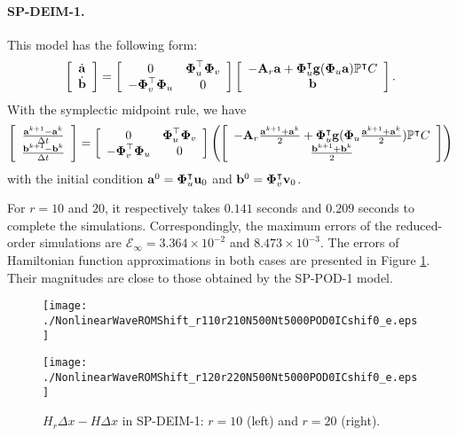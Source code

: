 \documentclass[11pt]{article}
\begin{document}
\paragraph{SP-DEIM-1.} This model has the following form: 
\begin{equation}
\left[
\begin{array}{c}
\dot{{\bf a}}\\
\dot{{\bf b}}
\end{array}
\right] =
\left[
\begin{array}{cc}
0 & \boldsymbol{\Phi}_u^\top \boldsymbol{\Phi}_v \\
-\boldsymbol{\Phi}_v^\top \boldsymbol{\Phi}_u & 0
\end{array}
\right]
\left[
\begin{array}{c}
-{\bf A}_r {\bf a} + \boldsymbol{\Phi}_u^\intercal {\bf g}(\boldsymbol{\Phi}_u {\bf a})\mathbb{P}^\intercal C \\
{\bf b}
\end{array}
\right].
\end{equation}
With the symplectic midpoint rule, we have 
\begin{equation}
\left[
\begin{array}{c}
\frac{{\bf a}^{k+1}-{\bf a}^{k}}{\Delta t}\\
\frac{{\bf b}^{k+1}-{\bf b}^{k}}{\Delta t}
\end{array}
\right] =
\left[
\begin{array}{cc}
0 & \boldsymbol{\Phi}_u^\top \boldsymbol{\Phi}_v \\
-\boldsymbol{\Phi}_v^\top \boldsymbol{\Phi}_u & 0
\end{array}
\right]
\left(
\left[
\begin{array}{c}
-{\bf A}_r \frac{{\bf a}^{k+1}+{\bf a}^k}{2}+ \boldsymbol{\Phi}_u^\intercal {\bf g}(\boldsymbol{\Phi}_u \frac{{\bf a}^{k+1}+{\bf a}^k}{2})\mathbb{P}^\intercal C\\
\frac{{\bf b}^{k+1}+{\bf b}^k}{2}
\end{array}
\right]
\right)
\end{equation}
with the initial condition ${\bf a}^0 = \boldsymbol{\Phi}_u^\intercal {\bf u}_0$ and ${\bf b}^0 = \boldsymbol{\Phi}_v^\intercal {\bf v}_0$.

For $r=10$ and $20$, it respectively takes $0.141$ seconds and $0.209$ seconds to complete the simulations. 
Correspondingly, the maximum errors of the reduced-order simulations are $\mathcal{E}_\infty= 3.364\times 10^{-2}$ and $8.473\times 10^{-3}$.
The errors of Hamiltonian function approximations in both cases are presented in Figure \ref{Fig: sp-deim1}. 
Their magnitudes are close to those obtained by the SP-POD-1 model.  

\begin{figure}[htb]
\centering
\begin{minipage}[ht]{0.45\linewidth}
\texttt{[image: ./NonlinearWaveROMShift\_r110r210N500Nt5000POD0ICshif0\_e.eps]}
\end{minipage}
\hspace{1cm}
\begin{minipage}[ht]{0.45\linewidth}
\texttt{[image: ./NonlinearWaveROMShift\_r120r220N500Nt5000POD0ICshif0\_e.eps]}
\end{minipage}
\caption{
$H_r\Delta x - H\Delta x$ in SP-DEIM-1: $r=10$ (left) and $r=20$ (right). 
}\label{Fig: sp-deim1}
\end{figure}
\end{document}
